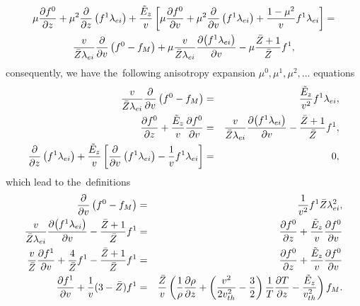 \documentclass[preprint,12pt]{elsarticle}
\begin{document}
\begin{multline}
  \mu\frac{\partial{f^0}}{\partial{z}} + \mu^2 \frac{\partial{}}{\partial{z}}\left(f^1 \lambda_{ei} \right)
  + \frac{\tilde{E}_z}{v} \left[ \mu \frac{\partial{f^0}}{\partial{v}} 
  + \mu^2 \frac{\partial{}}{\partial{v}} \left( f^1 \lambda_{ei} \right) 
  + \frac{1 - \mu^2}{v}f^1 \lambda_{ei}
  \right] 
  =\\
  \frac{v}{\bar{Z}\lambda_{ei}}\frac{\partial{}}{\partial{v}}
  \left( f^0 -f_M\right)
  + \mu\frac{v}{\bar{Z}\lambda_{ei}}\frac{\partial{\left(f^1 \lambda_{ei}\right)}}{\partial{v}} 
  - \mu \frac{\bar{Z} + 1}{\bar{Z}}f^1 ,
  \label{eq:AWBS_spherical}
\end{multline}
consequently, we have the~following anisotropy expansion 
$\mu^0, \mu^1, \mu^2, ...$ equations
\begin{eqnarray}
  \frac{v}{\bar{Z}\lambda_{ei}}\frac{\partial{}}{\partial{v}}
  \left( f^0 -f_M\right) &=& \frac{\tilde{E}_z}{v^2}f^1 \lambda_{ei} , 
  \nonumber \\
  \frac{\partial{f^0}}{\partial{z}} + \frac{\tilde{E}_z}{v}\frac{\partial{f^0}}{\partial{v}} &=& 
  \frac{v}{\bar{Z}\lambda_{ei}}\frac{\partial{\left(f^1 \lambda_{ei}\right)}}{\partial{v}}  
  - \frac{\bar{Z} + 1}{\bar{Z}} f^1 , 
  \nonumber \\ 
  \frac{\partial{}}{\partial{z}}\left(f^1 \lambda_{ei} \right) 
  + \frac{\tilde{E}_z}{v} \left[\frac{\partial{}}{\partial{v}} \left( f^1 \lambda_{ei} \right)
  - \frac{1}{v}f^1 \lambda_{ei} \right] &=& 0 , \nonumber
\end{eqnarray}
which lead to the~definitions
\begin{eqnarray}
  \frac{\partial{}}{\partial{v}}\left( f^0 -f_M\right) &=& \frac{1}{v^2}f^1 \bar{Z}\lambda_{ei}^2 ,
  \label{eq:AWBS_f0} \\
  \frac{v}{\bar{Z}\lambda_{ei}}\frac{\partial{\left(f^1 \lambda_{ei}\right)}}{\partial{v}}  
  - \frac{\bar{Z} + 1}{\bar{Z}} f^1 &=&
  \frac{\partial{f^0}}{\partial{z}} + \frac{\tilde{E}_z}{v}\frac{\partial{f^0}}{\partial{v}}
  \nonumber \\  
  \frac{v}{\bar{Z}}\frac{\partial{f^1}}{\partial{v}} + \frac{4}{\bar{Z}}f^1 
  - \frac{\bar{Z} + 1}{\bar{Z}} f^1 &=&
  \frac{\partial{f^0}}{\partial{z}} + \frac{\tilde{E}_z}{v}\frac{\partial{f^0}}{\partial{v}}
  \nonumber \\
  \frac{\partial{f^1}}{\partial{v}} + \frac{1}{v}(3-\bar{Z})f^1
  &=&
  \frac{\bar{Z}}{v}\left(\frac{1}{\rho}\frac{\partial{\rho}}{\partial{z}} + 
  \left( \frac{v^2}{2 v_{th}^2} - \frac{3}{2}\right)
  \frac{1}{T}\frac{\partial{T}}{\partial{z}} - \frac{\tilde{E}_z}{v_{th}^2}\right)f_M .
  \label{eq:AWBS_f1}
\end{eqnarray}
\end{document}
